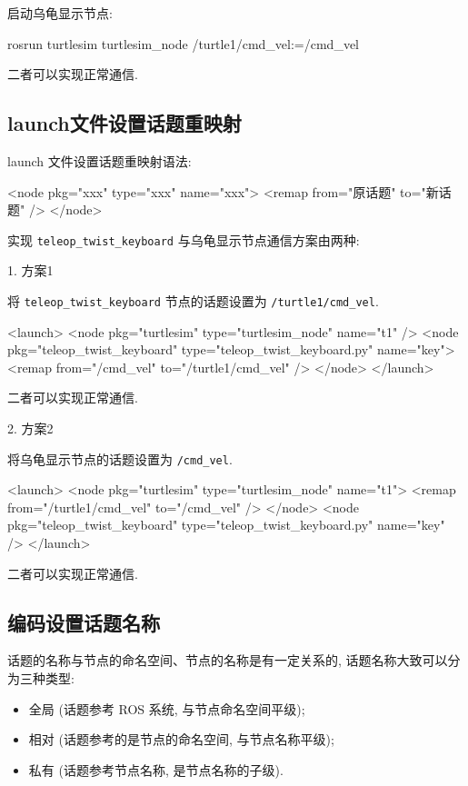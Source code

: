 \documentclass[openany, fontset=windowsold]{ctexbook}
\theoremstyle{kaiti}
\theoremstyle{normal}
\begin{document}
启动乌龟显示节点: 

\begin{bash}
  rosrun turtlesim turtlesim_node /turtle1/cmd_vel:=/cmd_vel
\end{bash}

二者可以实现正常通信.

\subsection{launch文件设置话题重映射}

launch 文件设置话题重映射语法:

\begin{xml}
  <node pkg="xxx" type="xxx" name="xxx">
      <remap from="原话题" to="新话题" />
  </node>
\end{xml}

实现 \verb|teleop_twist_keyboard| 与乌龟显示节点通信方案由两种: 

1. 方案1

将 \verb|teleop_twist_keyboard| 节点的话题设置为 \verb|/turtle1/cmd_vel|.

\begin{xml}
  <launch>
      <node pkg="turtlesim" type="turtlesim_node" name="t1" />
      <node pkg="teleop_twist_keyboard" type="teleop_twist_keyboard.py" name="key">
          <remap from="/cmd_vel" to="/turtle1/cmd_vel" />
      </node>
  </launch>
\end{xml}

二者可以实现正常通信.

2. 方案2

将乌龟显示节点的话题设置为 \verb|/cmd_vel|.

\begin{xml}
  <launch>
      <node pkg="turtlesim" type="turtlesim_node" name="t1">
          <remap from="/turtle1/cmd_vel" to="/cmd_vel" />
      </node>
      <node pkg="teleop_twist_keyboard" type="teleop_twist_keyboard.py" name="key" />
  </launch>
\end{xml}

二者可以实现正常通信.

\subsection{编码设置话题名称}

话题的名称与节点的命名空间、节点的名称是有一定关系的, 话题名称大致可以分为三种类型:

\begin{itemize}
  \item 全局 (话题参考 ROS 系统, 与节点命名空间平级);
  \item 相对 (话题参考的是节点的命名空间, 与节点名称平级);
  \item 私有 (话题参考节点名称, 是节点名称的子级).
\end{itemize}
\end{document}
